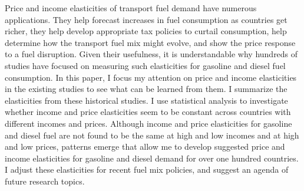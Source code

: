 Price and income elasticities of transport fuel demand have numerous applications. They help forecast increases in fuel consumption as countries get richer, they help develop appropriate tax policies to curtail consumption, help determine how the transport fuel mix might evolve, and show the price response to a fuel disruption. Given their usefulness, it is understandable why hundreds of studies have focused on measuring such elasticities for gasoline and diesel fuel consumption. In this paper, I focus my attention on price and income elasticities in the existing studies to see what can be learned from them. I summarize the elasticities from these historical studies. I use statistical analysis to investigate whether income and price elasticities seem to be constant across countries with different incomes and prices. Although income and price elasticities for gasoline and diesel fuel are not found to be the same at high and low incomes and at high and low prices, patterns emerge that allow me to develop suggested price and income elasticities for gasoline and diesel demand for over one hundred countries. I adjust these elasticities for recent fuel mix policies, and suggest an agenda of future research topics.